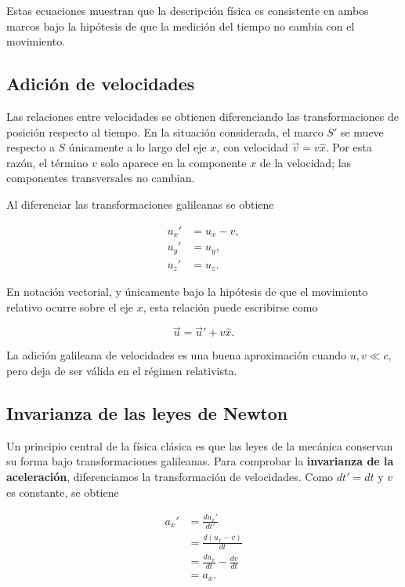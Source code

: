Estas ecuaciones muestran que la descripción física es consistente en ambos marcos bajo la hipótesis de que la medición del tiempo no cambia con el movimiento.

\subsection{Adición de velocidades}

Las relaciones entre velocidades se obtienen diferenciando las transformaciones de posición respecto al tiempo. En la situación considerada, el marco $S'$ se mueve respecto a $S$ únicamente a lo largo del eje $x$, con velocidad $\vec{v}=v\hat{x}$. Por esta razón, el término $v$ solo aparece en la componente $x$ de la velocidad; las componentes transversales no cambian.

Al diferenciar las transformaciones galileanas se obtiene

\begin{align*}
    u_x' &= u_x-v, \\
    u_y' &= u_y, \\
    u_z' &= u_z.
\end{align*}

En notación vectorial, y únicamente bajo la hipótesis de que el movimiento relativo ocurre sobre el eje $x$, esta relación puede escribirse como

\[
    \vec{u}=\vec{u}'+v\hat{x}.
\]

La adición galileana de velocidades es una buena aproximación cuando $u,v\ll c$, pero deja de ser válida en el régimen relativista.

\subsection{Invarianza de las leyes de Newton}

Un principio central de la física clásica es que las leyes de la mecánica conservan su forma bajo transformaciones galileanas. Para comprobar la \textbf{invarianza de la aceleración}, diferenciamos la transformación de velocidades. Como $dt'=dt$ y $v$ es constante, se obtiene

\begin{align*}
    a_x'
    &= \frac{du_x'}{dt'} \\
    &= \frac{d(u_x-v)}{dt} \\
    &= \frac{du_x}{dt}-\frac{dv}{dt} \\
    &= a_x.
\end{align*}

